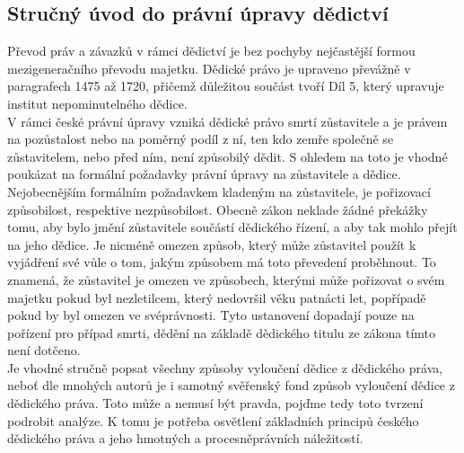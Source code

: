 \documentclass{article}
\begin{document}

\subsection{Stručný úvod do právní úpravy dědictví}

Převod práv a závazků v rámci dědictví je bez pochyby nejčastější formou mezigeneračního převodu majetku. Dědické právo je upraveno převážně v paragrafech 1475 až 1720, přičemž důležitou součást tvoří Díl 5, který upravuje institut nepominutelného dědice.\\

V rámci české právní úpravy vzniká dědické právo smrtí zůstavitele a je právem na pozůstalost nebo na poměrný podíl z ní, ten kdo zemře společně se zůstavitelem, nebo před ním, není způsobilý dědit. S ohledem na toto je vhodné poukázat na formální požadavky právní úpravy na zůstavitele a dědice. Nejobecnějším formálním požadavkem kladeným na zůstavitele, je pořizovací způsobilost, respektive nezpůsobilost. Obecně zákon neklade žádné překážky tomu, aby bylo jmění zůstavitele součástí dědického řízení, a aby tak mohlo přejít na jeho dědice. Je nicméně omezen způsob, který může zůstavitel použít k vyjádření své vůle o tom, jakým způsobem má toto převedení proběhnout. To znamená, že zůstavitel je omezen ve způsobech, kterými může pořizovat o svém majetku pokud byl nezletilcem, který nedovršil věku patnácti let, popřípadě pokud by byl omezen ve svéprávnosti. Tyto ustanovení dopadají pouze na pořízení pro případ smrti, dědění na základě dědického titulu ze zákona tímto není dotčeno. \\

Je vhodné stručně popsat všechny způsoby vyloučení dědice z dědického práva, neboť dle mnohých autorů je i samotný svěřenský fond způsob vyloučení dědice z dědického práva. Toto může a nemusí být pravda, pojďme tedy toto tvrzení podrobit analýze. K tomu je potřeba osvětlení základních principů českého dědického práva a jeho hmotných a procesněprávních náležitostí.\\
\end{document}

